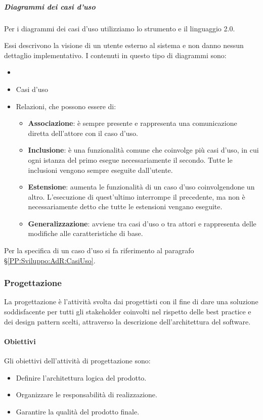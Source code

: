		\subparagraph{Diagrammi dei casi d'uso}\label{PP:Sviluppo:DiagrammiCasiUso}
		Per i diagrammi dei casi d'uso utilizziamo lo strumento  e il linguaggio  2.0.\par
		Essi descrivono la visione di un utente
		esterno al sistema e non danno nessun dettaglio implementativo. I  contenuti in questo tipo di diagrammi sono:
		\begin{itemize}
			\item {}
			\item Casi d'uso
			\item Relazioni, che possono essere di:
			\begin{itemize}
				\item \textbf{Associazione}: è sempre presente e rappresenta una comunicazione diretta dell'attore con il caso d'uso.
				\item \textbf{Inclusione}: è una funzionalità comune che coinvolge più casi d'uso, in cui ogni istanza del primo esegue
					necessariamente il secondo. Tutte le inclusioni vengono sempre eseguite dall'utente.
				\item \textbf{Estensione}: aumenta le funzionalità di un caso d'uso coinvolgendone un altro. L'esecuzione di quest'ultimo interrompe il precedente, ma non è necessariamente detto che tutte le estensioni vengano eseguite.
				\item \textbf{Generalizzazione}: avviene tra casi d'uso o tra attori e rappresenta delle modifiche alle caratteristiche di base.
			\end{itemize}
		\end{itemize}
		Per la specifica di un caso d'uso si fa riferimento al paragrafo \S\ref{PP:Sviluppo:AdR:CasiUso}.

        \subsubsection{Progettazione}\label{PP:Sviluppo:Progettazione}
        La progettazione è l'attività svolta dai progettisti con il fine di dare una soluzione soddisfacente per tutti gli stakeholder coinvolti nel rispetto delle best practice e dei design pattern scelti, attraverso la descrizione dell'architettura del software.

		\paragraph{Obiettivi}\label{PP:Sviluppo:Progettazione:Obiettivi}
        Gli obiettivi dell'attività di progettazione sono:
        \begin{itemize}
			\item Definire l'architettura logica del prodotto.
			\item Organizzare le responsabilità di realizzazione.
			\item Garantire la qualità del prodotto finale.
		\end{itemize}

